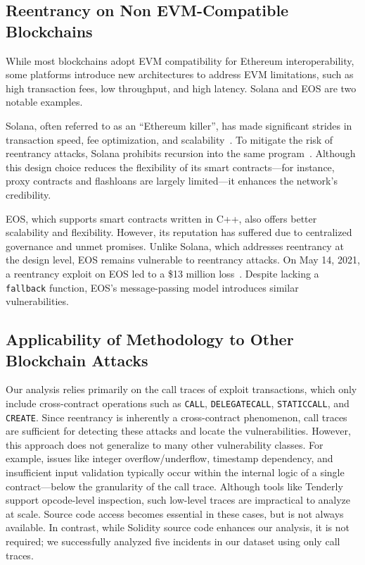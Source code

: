 \subsection{Reentrancy on Non EVM-Compatible Blockchains}

While most blockchains adopt EVM compatibility for Ethereum interoperability, some platforms introduce new architectures to address EVM limitations, such as high transaction fees, low throughput, and high latency. Solana and EOS are two notable examples.

Solana, often referred to as an ``Ethereum killer'', has made significant strides in transaction speed, fee optimization, and scalability~\cite{solana-vs-ethereum}. To mitigate the risk of reentrancy attacks, Solana prohibits recursion into the same program~\cite{solana-security}. Although this design choice reduces the flexibility of its smart contracts—for instance, proxy contracts and flashloans are largely limited—it enhances the network's credibility.

EOS, which supports smart contracts written in C++, also offers better scalability and flexibility. However, its reputation has suffered due to centralized governance and unmet promises. Unlike Solana, which addresses reentrancy at the design level, EOS remains vulnerable to reentrancy attacks. On May 14, 2021, a reentrancy exploit on EOS led to a \$13 million loss~\cite{attack-report:sx}. Despite lacking a \lstinline{fallback} function, EOS's message-passing model introduces similar vulnerabilities.


\subsection{Applicability of Methodology to Other Blockchain Attacks}

Our analysis relies primarily on the call traces of exploit transactions, which only include cross-contract operations such as \lstinline{CALL}, \lstinline{DELEGATECALL}, \lstinline{STATICCALL}, and \lstinline{CREATE}. Since reentrancy is inherently a cross-contract phenomenon, call traces are sufficient for detecting these attacks and locate the vulnerabilities.
However, this approach does not generalize to many other vulnerability classes. For example, issues like integer overflow/underflow, timestamp dependency, and insufficient input validation typically occur within the internal logic of a single contract—below the granularity of the call trace. Although tools like Tenderly~\cite{tenderly} support opcode-level inspection, such low-level traces are impractical to analyze at scale. Source code access becomes essential in these cases, but is  not always available. In contrast, while Solidity source code enhances our analysis, it is not  required; we successfully analyzed five incidents in our dataset using only call traces.

